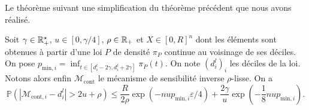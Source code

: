 Le théorème suivant une simplification du théorème précédent que nous avons réalisé.

\begin{theorem}
    \label{EDE}
    Soit \(\gamma \in \mathbb{R}_+^\star\), \(u \in [0, \gamma/4]\), \(\rho \in \mathbb{R}_+\) et \(X \in [0,R]^n\) dont les éléments sont obtenues à partir d'une loi \(P\) de densité \(\pi_P\) continue au voisinage de ses déciles. On pose \(p_{\text{min}, i} = \inf_{t \in [d_i^l - 2\gamma, d_i^l + 2\gamma]} \pi_P(t)\). On note \((d_i^l)_i\) les déciles de la loi. Notons alors enfin \(\mathcal M_{\text{cont}}\) le mécanisme de sensibilité inverse \(\rho\)-lisse. On a
    \[
        \mathbb P\left( |\mathcal  M_{\text{cont}, i} - d_i^l| > 2u + \rho \right) \leq  \dfrac{R}{2\rho}\exp\left( -{nup_{\text{min}, i}\varepsilon}/{4} \right) + \dfrac{2\gamma}{u}\exp\left( - \dfrac{1}{8}n u p_{\text{min}, i} \right). 
    \]
\end{theorem}

